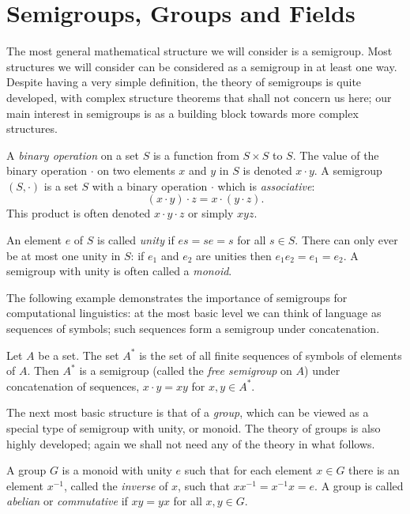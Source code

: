 \documentclass[12pt]{report}
\begin{document}
\section{Semigroups, Groups and Fields}

The most general mathematical structure we will consider is a semigroup. Most structures we will consider can be considered as a semigroup in at least one way. Despite having a very simple definition, the theory of semigroups is quite developed, with complex structure theorems that shall not concern us here; our main interest in semigroups is as a building block towards more complex structures.

\begin{defn}[Semigroup]
A \emph{binary operation} on a set $S$ is a function from $S\times S$ to $S$. The value of the binary operation $\cdot$ on two elements $x$ and $y$ in $S$ is denoted $x \cdot y$. A semigroup $(S,\cdot)$ is a set $S$ with a binary operation $\cdot$ which is \emph{associative}:
$$(x\cdot y)\cdot z = x \cdot (y \cdot z).$$
This product is often denoted $x\cdot y \cdot z$ or simply $xyz$.

An element $e$ of $S$ is called \emph{unity} if $es = se = s$ for all $s \in S$. There can only ever be at most one unity in $S$: if $e_1$ and $e_2$ are unities then $e_1e_2 = e_1 = e_2$. A semigroup with unity is often called a \emph{monoid}.
\end{defn}
 
 The following example demonstrates the importance of semigroups for computational linguistics: at the most basic level we can think of language as sequences of symbols; such sequences form a semigroup under concatenation.
 
 \begin{example}
Let $A$ be a set. The set $A^*$ is the set of all finite sequences of symbols of elements of $A$. Then $A^*$ is a semigroup (called the \emph{free semigroup} on $A$) under concatenation of sequences, $x\cdot y = xy$ for $x,y \in A^*$.
 \end{example}
 
 The next most basic structure is that of a \emph{group}, which can be viewed as a special type of semigroup with unity, or monoid. The theory of groups is also highly developed; again we shall not need any of the theory in what follows.
 
 \begin{defn}[Group]
 A group $G$ is a monoid with unity $e$ such that for each element $x \in G$ there is an element $x^{-1}$, called the \emph{inverse} of $x$, such that $xx^{-1} = x^{-1}x = e$. A group is called \emph{abelian} or \emph{commutative} if $xy = yx$ for all $x,y\in G$.
 \end{defn}
 
\end{document}

